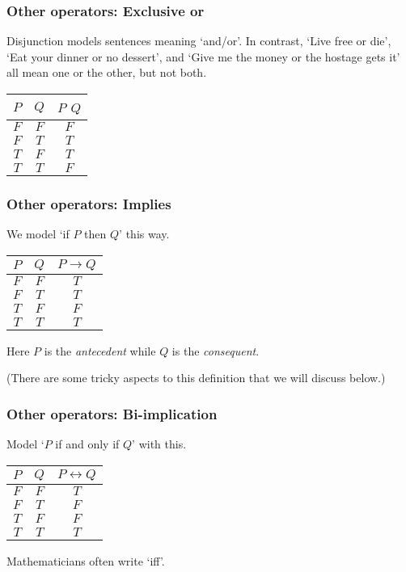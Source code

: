 \documentclass[10pt,t]{beamer}
\begin{document}
\begin{frame}
  \frametitle{Other operators: Exclusive or}

Disjunction models
sentences meaning `and/or'.
In contrast,
`Live free or die', 
`Eat your dinner or no dessert', and
`Give me the money or the hostage gets it' all 
mean one or the other, but not both.
\begin{center}
  \begin{tabular}{cc|c}
    $P$  &$Q$  &$P$ \text{\small\textsc{XOR}} $Q$  \\ \hline
    $F$  &$F$  &$F$          \\
    $F$  &$T$  &$T$          \\
    $T$  &$F$  &$T$          \\
    $T$  &$T$  &$F$     
  \end{tabular}
\end{center}
\end{frame}




\begin{frame}
  \frametitle{Other operators: Implies}

We model `if $P$ then $Q$' this way.
\begin{center}
  \begin{tabular}{cc|c}
    $P$  &$Q$  &$P \rightarrow Q$  \\ \hline
    $F$  &$F$  &$T$          \\
    $F$  &$T$  &$T$          \\
    $T$  &$F$  &$F$          \\
    $T$  &$T$  &$T$     
  \end{tabular}
\end{center}
Here $P$ is the \emph{antecedent} while $Q$ is the 
\emph{consequent}. 

(There are some tricky aspects to this definition that we will discuss below.)
\end{frame}




\begin{frame}
  \frametitle{Other operators: Bi-implication}

Model `$P$ if and only if $Q$' with this.
\begin{center}
  \begin{tabular}{cc|c}
    $P$  &$Q$  &$P \leftrightarrow Q$  \\ \hline
    $F$  &$F$  &$T$          \\
    $F$  &$T$  &$F$          \\
    $T$  &$F$  &$F$          \\
    $T$  &$T$  &$T$     
  \end{tabular}
\end{center}
Mathematicians often write `iff'.
\end{frame}
\end{document}
